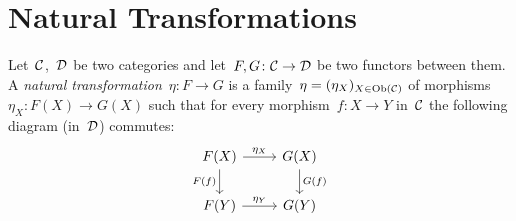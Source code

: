 \section{Natural Transformations}


\begin{definition}
  Let~$\mathcal{C}$,~$\mathcal{D}$ be two categories and let~$F, G \colon \mathcal{C} \to \mathcal{D}$ be two functors between them.
  A \emph{natural transformation}~$\eta \colon F \to G$ is a family~$\eta = (\eta_X)_{X \in \operatorname{Ob}(\mathcal{C})}$ of morphisms~$\eta_X \colon F(X) \to G(X)$ such that for every morphism~$f \colon X \to Y$ in~$\mathcal{C}$ the following diagram (in~$\mathcal{D}$) commutes:
  \[
    \begin{tikzcd}
        F(X)
        \arrow{r}[above]{\eta_X}
        \arrow{d}[left]{F(f)}
      & G(X)
        \arrow{d}[right]{G(f)}
      \\
        F(Y)
        \arrow{r}[above]{\eta_Y}
      & G(Y)
    \end{tikzcd}
  \]
\end{definition}


